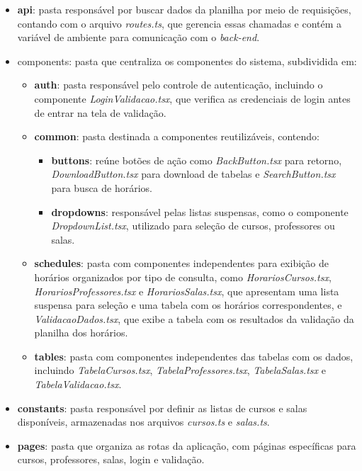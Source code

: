 \begin{itemize}
    \item \textbf{api}: pasta responsável por buscar dados da planilha por meio de requisições, contando com o arquivo \textit{routes.ts}, que gerencia essas chamadas e contém a variável de ambiente para comunicação com o \textit{back-end}.
    \item components: pasta que centraliza os componentes do sistema, subdividida em:
    \begin{itemize}
        \item \textbf{auth}: pasta responsável pelo controle de autenticação, incluindo o componente \textit{LoginValidacao.tsx}, que verifica as credenciais de login antes de entrar na tela de validação.
        \item \textbf{common}: pasta destinada a componentes reutilizáveis, contendo:
        \begin{itemize}
            \item \textbf{buttons}: reúne botões de ação como \textit{BackButton.tsx} para retorno, \textit{DownloadButton.tsx} para download de tabelas e \textit{SearchButton.tsx} para busca de horários.
             \item \textbf{dropdowns}: responsável pelas listas suspensas, como o componente \textit{DropdownList.tsx}, utilizado para seleção de cursos, professores ou salas.
        \end{itemize}
        \item \textbf{schedules}: pasta com componentes independentes para exibição de horários organizados por tipo de consulta, como \textit{HorariosCursos.tsx}, \textit{HorariosProfessores.tsx} e \textit{HorariosSalas.tsx}, que apresentam uma lista suspensa para seleção e uma tabela com os horários correspondentes, e \textit{ValidacaoDados.tsx}, que exibe a tabela com os resultados da validação da planilha dos horários.
        \item \textbf{tables}: pasta com componentes independentes das tabelas com os dados, incluindo \textit{TabelaCursos.tsx}, \textit{TabelaProfessores.tsx}, \textit{TabelaSalas.tsx} e \textit{TabelaValidacao.tsx}.
    \end{itemize}
    \item \textbf{constants}: pasta responsável por definir as listas de cursos e salas disponíveis, armazenadas nos arquivos \textit{cursos.ts} e \textit{salas.ts}.
    \item \textbf{pages}: pasta que organiza as rotas da aplicação, com páginas específicas para cursos, professores, salas, login e validação.

\end{itemize}
